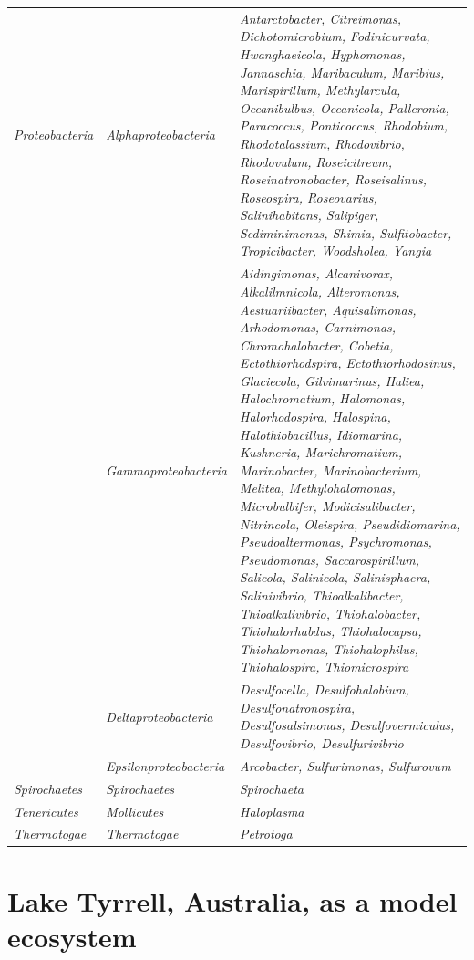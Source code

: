 \begin{center}
\begin{longtable}{p{3cm} p{4.5cm} p{5.5cm}}
\textit{Proteobacteria} & \textit{Alphaproteobacteria} & \textit{Antarctobacter, Citreimonas, Dichotomicrobium, Fodinicurvata, Hwanghaeicola, Hyphomonas, Jannaschia, Maribaculum, Maribius, Marispirillum, Methylarcula, Oceanibulbus, Oceanicola, Palleronia, Paracoccus, Ponticoccus, Rhodobium, Rhodotalassium, Rhodovibrio, Rhodovulum, Roseicitreum, Roseinatronobacter, Roseisalinus, Roseospira, Roseovarius, Salinihabitans, Salipiger, Sediminimonas, Shimia, Sulfitobacter, Tropicibacter, Woodsholea, Yangia} \\
\cline{2-3}
& \textit{Gammaproteobacteria} & \textit{Aidingimonas, Alcanivorax, Alkalilmnicola, Alteromonas, Aestuariibacter, Aquisalimonas, Arhodomonas, Carnimonas, Chromohalobacter, Cobetia, Ectothiorhodspira, Ectothiorhodosinus, Glaciecola, Gilvimarinus, Haliea, Halochromatium, Halomonas, Halorhodospira, Halospina, Halothiobacillus, Idiomarina, Kushneria, Marichromatium, Marinobacter, Marinobacterium, Melitea, Methylohalomonas, Microbulbifer, Modicisalibacter, Nitrincola, Oleispira, Pseudidiomarina, Pseudoaltermonas, Psychromonas, Pseudomonas, Saccarospirillum, Salicola, Salinicola, Salinisphaera, Salinivibrio, Thioalkalibacter, Thioalkalivibrio, Thiohalobacter, Thiohalorhabdus, Thiohalocapsa, Thiohalomonas, Thiohalophilus, Thiohalospira, Thiomicrospira} \\
\cline{2-3}
& \textit{Deltaproteobacteria} & \textit{Desulfocella, Desulfohalobium, Desulfonatronospira, Desulfosalsimonas, Desulfovermiculus, Desulfovibrio, Desulfurivibrio} \\
\cline{2-3}
& \textit{Epsilonproteobacteria} & \textit{Arcobacter, Sulfurimonas, Sulfurovum} \\
\hline

\textit{Spirochaetes} & \textit{Spirochaetes} & \textit{Spirochaeta} \\
\hline

\textit{Tenericutes} & \textit{Mollicutes} & \textit{Haloplasma} \\
\hline

\textit{Thermotogae} & \textit{Thermotogae} & \textit{Petrotoga} \\

\end{longtable}

\end{center}





\section{Lake Tyrrell, Australia, as a model ecosystem}

